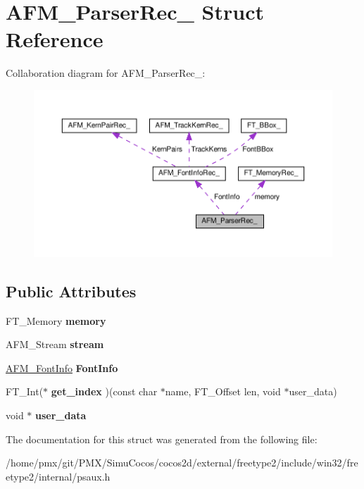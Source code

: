 \hypertarget{structAFM__ParserRec__}{}\section{A\+F\+M\+\_\+\+Parser\+Rec\+\_\+ Struct Reference}
\label{structAFM__ParserRec__}


Collaboration diagram for A\+F\+M\+\_\+\+Parser\+Rec\+\_\+\+:
\nopagebreak
\begin{figure}[H]
\begin{center}
\leavevmode
\includegraphics[width=350pt]{structAFM__ParserRec____coll__graph}
\end{center}
\end{figure}
\subsection*{Public Attributes}
\begin{DoxyCompactItemize}
\item 
\mbox{\label{structAFM__ParserRec___a3fec8b1760fa9261f48ee87dc2b3858b}} 
F\+T\+\_\+\+Memory {\bfseries memory}
\item 
\mbox{\label{structAFM__ParserRec___adf3b1165216cbd1f7ec7ae736fd4270a}} 
A\+F\+M\+\_\+\+Stream {\bfseries stream}
\item 
\mbox{\label{structAFM__ParserRec___ae53d6cddac32a0eb7014c3a9f74517df}} 
\hyperlink{structAFM__FontInfoRec__}{A\+F\+M\+\_\+\+Font\+Info} {\bfseries Font\+Info}
\item 
\mbox{\label{structAFM__ParserRec___a5f93c5c83d0957c19d3827071d90926f}} 
F\+T\+\_\+\+Int($\ast$ {\bfseries get\+\_\+index} )(const char $\ast$name, F\+T\+\_\+\+Offset len, void $\ast$user\+\_\+data)
\item 
\mbox{\label{structAFM__ParserRec___aaee92a2d61a444a1f6d855575d64f3d1}} 
void $\ast$ {\bfseries user\+\_\+data}
\end{DoxyCompactItemize}


The documentation for this struct was generated from the following file\+:\begin{DoxyCompactItemize}
\item 
/home/pmx/git/\+P\+M\+X/\+Simu\+Cocos/cocos2d/external/freetype2/include/win32/freetype2/internal/psaux.\+h\end{DoxyCompactItemize}
